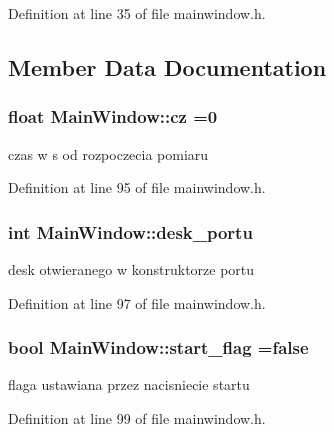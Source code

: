 Definition at line 35 of file mainwindow.\+h.



\subsection{Member Data Documentation}
\subsubsection[{\texorpdfstring{cz}{cz}}]{\setlength{\rightskip}{0pt plus 5cm}float Main\+Window\+::cz =0\hspace{0.3cm}{\ttfamily [private]}}\hypertarget{class_main_window_a408ca1239ef6ff692b8d4b9b7bd3c7db}{}\label{class_main_window_a408ca1239ef6ff692b8d4b9b7bd3c7db}
czas w s od rozpoczecia pomiaru 

Definition at line 95 of file mainwindow.\+h.

\subsubsection[{\texorpdfstring{desk\+\_\+portu}{desk_portu}}]{\setlength{\rightskip}{0pt plus 5cm}int Main\+Window\+::desk\+\_\+portu\hspace{0.3cm}{\ttfamily [private]}}\hypertarget{class_main_window_a227a342bafd8ac62990190f15bdabdb3}{}\label{class_main_window_a227a342bafd8ac62990190f15bdabdb3}
desk otwieranego w konstruktorze portu 

Definition at line 97 of file mainwindow.\+h.

\subsubsection[{\texorpdfstring{start\+\_\+flag}{start_flag}}]{\setlength{\rightskip}{0pt plus 5cm}bool Main\+Window\+::start\+\_\+flag =false\hspace{0.3cm}{\ttfamily [private]}}\hypertarget{class_main_window_a2d263bf60dff7452a4fabba4f1ef47dc}{}\label{class_main_window_a2d263bf60dff7452a4fabba4f1ef47dc}
flaga ustawiana przez nacisniecie startu 

Definition at line 99 of file mainwindow.\+h.

